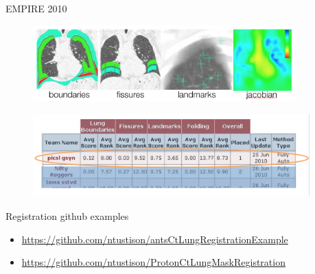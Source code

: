 \documentclass[ignorenonframetext,]{beamer}
\begin{document}
\begin{frame}{EMPIRE 2010}

\centering

\begin{figure}
  \includegraphics[width=0.9\textwidth]{./competitions/figures/EMPIRE10criteria.png}
\end{figure}

\centering

\begin{figure}
  \includegraphics[width=0.95\textwidth]{./competitions/figures/EMPIRE10Results.png}
\end{figure}

\end{frame}

\begin{frame}{Registration github examples}

\begin{itemize}
\item
  \url{https://github.com/ntustison/antsCtLungRegistrationExample}
\item
  \url{https://github.com/ntustison/ProtonCtLungMaskRegistration}
\end{itemize}

\end{frame}
\end{document}
